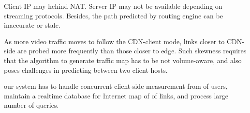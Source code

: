  Client IP may hehind NAT. Server IP may not be available depending on streaming protocols. Besides, the path predicted by routing engine can be inaccurate or stale.


 As more video traffic moves to follow the CDN-client mode, links closer to CDN-side are probed more frequently than those closer to edge. Such skewness requires that the algorithm to generate traffic map has to be not volume-aware, and also poses challenges in predicting between two client hosts.

 our system has to handle concurrent client-side measurement from \fillme of users, maintain a realtime database for Internet map of \fillme of links, and process large number of queries.


